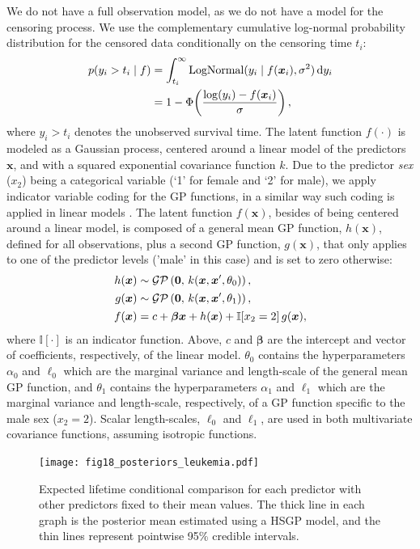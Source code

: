 We do not have a full observation model, as we do not have a model for the censoring process. We use the complementary cumulative log-normal probability distribution for the censored data conditionally on the censoring time $t_i$:
%
\begin{align*}
p(y_i > t_i \mid f) &= \int_{t_i}^{\infty} \operatorname{LogNormal}(y_i \mid f(\bm{x}_i),\sigma^2) \,\mathrm{d}y_i \\
&=  1 - \Phi\! \left( \frac{\log(y_i)-f(\bm{x}_i)}{\sigma} \right),
\end{align*}
%
where $y_i>t_i$ denotes the unobserved survival time.
The latent function $f(\cdot)$ is modeled as a Gaussian process, centered around a linear model of the predictors $\bm{x}$, and with a squared exponential covariance function $k$. Due to the predictor \textit{sex} ($x_2$) being a categorical variable (`1' for female and `2' for male), we apply indicator variable coding for the GP functions, in a similar way such coding is applied in linear models \citep{Gelman+Hill+Vehtari:2020:ROS}. The latent function $f(\bm{x})$, besides of being centered around a linear model, is composed of a general mean GP function, $h(\bm{x})$, defined for all observations, plus a second GP function, $g(\bm{x})$, that only applies to one of the predictor levels ('male' in this case) and is set to zero otherwise:
%
\begin{align*}
h(\bm{x}) &\sim \GP\left(\bm{0}, \, k(\bm{x},\bm{x}', \theta_0) \right),  \\[1pt] 
%
g(\bm{x}) &\sim \GP\left(\bm{0}, \, k(\bm{x},\bm{x}', \theta_1)\right),\\[1pt] 
%
f(\bm{x}) &= c + \bm{\beta} \bm{x} + h(\bm{x}) + \mathbb{I}\!\left[x_2=2\right]g(\bm{x}),
\end{align*}
%
where $\mathbb{I}\left[\cdot\right]$ is an indicator function. Above, $c$ and $\bm{\beta}$ are the intercept and vector of coefficients, respectively, of the linear model. $\theta_0$ contains the hyperparameters $\alpha_0$ and $\ell_0$ which are the marginal variance and length-scale of the general mean GP function, and $\theta_1$ contains the hyperparameters $\alpha_1$ and $\ell_1$ which are the marginal variance and length-scale, respectively, of a GP function specific to the male sex ($x_2=2$). Scalar length-scales, $\ell_0$ and $\ell_1$, are used in both multivariate covariance functions, assuming isotropic functions.
%
\begin{figure}
\centering
\texttt{[image: fig18\_posteriors\_leukemia.pdf]}
\caption{Expected lifetime conditional comparison for each predictor with other predictors fixed to their mean values. The thick line in each graph is the posterior mean estimated using a HSGP model, and the thin lines represent pointwise 95\% credible intervals.}
  \label{fig18_posteriors_leukemia}
\end{figure}

